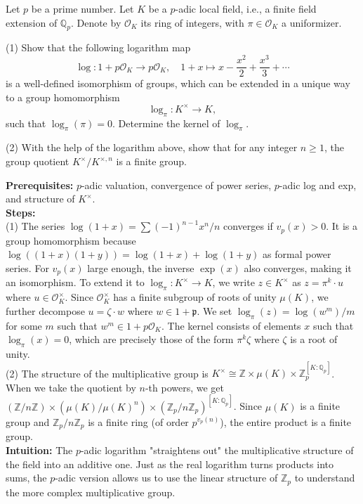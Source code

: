 \begin{exercise}
\label{algebra:2023:6}
Let $p$ be a prime number. Let $K$ be a $p$-adic local field, i.e., a finite field extension of $\mathbb{Q}_p$. Denote by $\mathcal{O}_K$ its ring of integers, with $\pi \in \mathcal{O}_K$ a uniformizer.

(1) Show that the following logarithm map
$$\log: 1 + p\mathcal{O}_K \longrightarrow p\mathcal{O}_K, \quad 1 + x \mapsto x - \frac{x^2}{2} + \frac{x^3}{3} + \cdots$$
is a well-defined isomorphism of groups, which can be extended in a unique way to a group homomorphism
$$\log_\pi: K^\times \longrightarrow K,$$
such that $\log_\pi(\pi) = 0$. Determine the kernel of $\log_\pi$.

(2) With the help of the logarithm above, show that for any integer $n \geq 1$, the group quotient $K^\times / K^{\times, n}$ is a finite group.
\end{exercise}

\begin{solution}
\textbf{Prerequisites:} $p$-adic valuation, convergence of power series, $p$-adic log and exp, and structure of $K^\times$. \\[2ex]

\textbf{Steps:} \\[2ex]
(1) The series $\log(1+x) = \sum (-1)^{n-1} x^n/n$ converges if $v_p(x) > 0$. It is a group homomorphism because $\log((1+x)(1+y)) = \log(1+x) + \log(1+y)$ as formal power series. For $v_p(x)$ large enough, the inverse $\exp(x)$ also converges, making it an isomorphism. To extend it to $\log_\pi: K^\times \to K$, we write $z \in K^\times$ as $z = \pi^k \cdot u$ where $u \in \mathcal{O}_K^\times$. Since $\mathcal{O}_K^\times$ has a finite subgroup of roots of unity $\mu(K)$, we further decompose $u = \zeta \cdot w$ where $w \in 1 + \mathfrak{p}$. We set $\log_\pi(z) = \log(w^m)/m$ for some $m$ such that $w^m \in 1 + p\mathcal{O}_K$. The kernel consists of elements $x$ such that $\log_\pi(x) = 0$, which are precisely those of the form $\pi^k \zeta$ where $\zeta$ is a root of unity. \\[2ex]

(2) The structure of the multiplicative group is $K^\times \cong \mathbb{Z} \times \mu(K) \times \mathbb{Z}_p^{[K:\mathbb{Q}_p]}$. When we take the quotient by $n$-th powers, we get $(\mathbb{Z}/n\mathbb{Z}) \times (\mu(K)/\mu(K)^n) \times (\mathbb{Z}_p/n\mathbb{Z}_p)^{[K:\mathbb{Q}_p]}$. Since $\mu(K)$ is a finite group and $\mathbb{Z}_p/n\mathbb{Z}_p$ is a finite ring (of order $p^{v_p(n)}$), the entire product is a finite group. \\[2ex]

\textbf{Intuition:} The $p$-adic logarithm "straightens out" the multiplicative structure of the field into an additive one. Just as the real logarithm turns products into sums, the $p$-adic version allows us to use the linear structure of $\mathbb{Z}_p$ to understand the more complex multiplicative group.
\end{solution}
